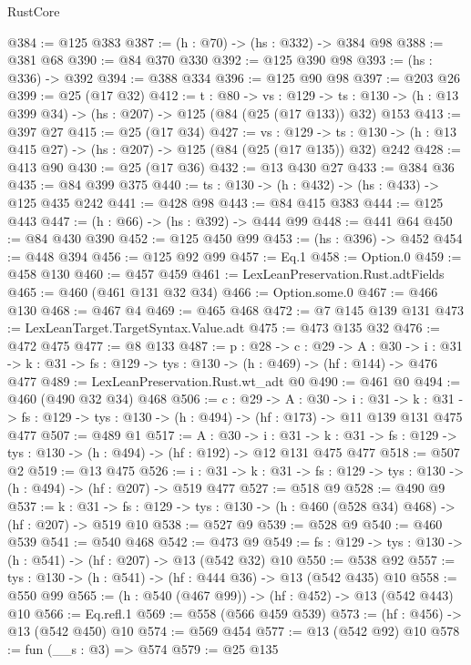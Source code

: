 \begin{lexlean}{RustCore}
\begin{coremodule}
@384 := @125 @383
@387 := (h : @70) -> (hs : @332) -> @384 @98
@388 := @381 @68
@390 := @84 @370 @330
@392 := @125 @390 @98
@393 := (hs : @336) -> @392
@394 := @388 @334
@396 := @125 @90 @98
@397 := @203 @26
@399 := @25 (@17 @32)
@412 := {t : @80} ->
  {vs : @129} ->
  {ts : @130} -> (h : @13 @399 @34) -> (hs : @207) -> @125 (@84 (@25 (@17 @133)) @32) @153
@413 := @397 @27
@415 := @25 (@17 @34)
@427 := {vs : @129} ->
  {ts : @130} -> (h : @13 @415 @27) -> (hs : @207) -> @125 (@84 (@25 (@17 @135)) @32) @242
@428 := @413 @90
@430 := @25 (@17 @36)
@432 := @13 @430 @27
@433 := @384 @36
@435 := @84 @399 @375
@440 := {ts : @130} -> (h : @432) -> (hs : @433) -> @125 @435 @242
@441 := @428 @98
@443 := @84 @415 @383
@444 := @125 @443
@447 := (h : @66) -> (hs : @392) -> @444 @99
@448 := @441 @64
@450 := @84 @430 @390
@452 := @125 @450 @99
@453 := (hs : @396) -> @452
@454 := @448 @394
@456 := @125 @92 @99
@457 := Eq.{1}
@458 := Option.{0}
@459 := @458 @130
@460 := @457 @459
@461 := LexLeanPreservation.Rust.adtFields
@465 := @460 (@461 @131 @32 @34)
@466 := Option.some.{0}
@467 := @466 @130
@468 := @467 @4
@469 := @465 @468
@472 := @7 @145 @139 @131
@473 := LexLeanTarget.TargetSyntax.Value.adt
@475 := @473 @135 @32
@476 := @472 @475
@477 := @8 @133
@487 := {p : @28} ->
  {c : @29} ->
  {A : @30} ->
  {i : @31} -> {k : @31} -> {fs : @129} -> {tys : @130} -> (h : @469) -> (hf : @144) -> @476 @477
@489 := LexLeanPreservation.Rust.wt_adt @0
@490 := @461 @0
@494 := @460 (@490 @32 @34) @468
@506 := {c : @29} ->
  {A : @30} ->
  {i : @31} ->
  {k : @31} -> {fs : @129} -> {tys : @130} -> (h : @494) -> (hf : @173) -> @11 @139 @131 @475 @477
@507 := @489 @1
@517 := {A : @30} ->
  {i : @31} ->
  {k : @31} -> {fs : @129} -> {tys : @130} -> (h : @494) -> (hf : @192) -> @12 @131 @475 @477
@518 := @507 @2
@519 := @13 @475
@526 := {i : @31} ->
  {k : @31} -> {fs : @129} -> {tys : @130} -> (h : @494) -> (hf : @207) -> @519 @477
@527 := @518 @9
@528 := @490 @9
@537 := {k : @31} ->
  {fs : @129} -> {tys : @130} -> (h : @460 (@528 @34) @468) -> (hf : @207) -> @519 @10
@538 := @527 @9
@539 := @528 @9
@540 := @460 @539
@541 := @540 @468
@542 := @473 @9
@549 := {fs : @129} -> {tys : @130} -> (h : @541) -> (hf : @207) -> @13 (@542 @32) @10
@550 := @538 @92
@557 := {tys : @130} -> (h : @541) -> (hf : @444 @36) -> @13 (@542 @435) @10
@558 := @550 @99
@565 := (h : @540 (@467 @99)) -> (hf : @452) -> @13 (@542 @443) @10
@566 := Eq.refl.{1}
@569 := @558 (@566 @459 @539)
@573 := (hf : @456) -> @13 (@542 @450) @10
@574 := @569 @454
@577 := @13 (@542 @92) @10
@578 := fun (__s : @3) => @574
@579 := @25 @135

\end{coremodule}
\end{lexlean}
